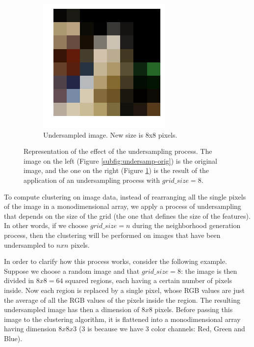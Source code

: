 \documentclass[12pt, twoside, a4paper]{report}
\begin{document}
\begin{figure}
\begin{subfigure}[b]{.465\linewidth}
\includegraphics[width=\linewidth]{images/undersamp-und.png}
\caption{Undersampled image. New size is 8x8 pixels.}
\label{subfig:undersamp-und}
\end{subfigure}
\caption{Representation of the effect of the undersampling process. The image on the left (Figure \ref{subfig:undersamp-orig}) is the original image, and the one on the right (Figure \ref{subfig:undersamp-und}) is the result of the application of an undersampling process with $grid\_size = 8$.}
\label{fig:undersamp-example}
\end{figure}

To compute clustering on image data, instead of rearranging all the single pixels of the image in a monodimensional array, we apply a process of undersampling that depends on the size of the grid (the one that defines the size of the features). In other words, if we choose $grid\_size = n$ during the neighborhood generation process, then the clustering will be performed on images that have been undersampled to $nxn$ pixels.

In order to clarify how this process works, consider the following example. Suppose we choose a random image and that $grid\_size=8$: the image is then divided in $8x8 = 64$ squared regions, each having a certain number of pixels inside. Now each region is replaced by a single pixel, whose RGB values are just the average of all the RGB values of the pixels inside the region. The resulting undersampled image has then a dimension of $8x8$ pixels. Before passing this image to the clustering algorithm, it is flattened into a monodimensional array having dimension $8x8x3$ (3 is because we have 3 color channels: Red, Green and Blue).
\bigskip
\end{document}
